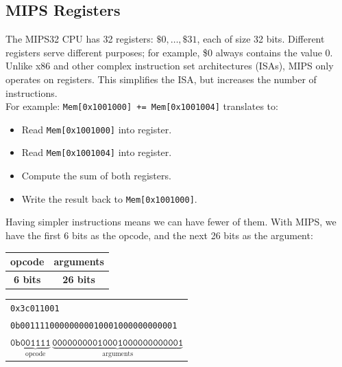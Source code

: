 \documentclass[a4paper, 11pt]{article}
\theoremstyle{definition}
\begin{document}
\newpage

\subsection{MIPS Registers}
The MIPS32 CPU has 32 registers: $\$0, \dots, \$31$, each of size 32 bits. Different registers serve different purposes;
for example, \$0 always contains the value 0. Unlike x86 and other complex instruction set architectures (ISAs), MIPS only 
operates on registers. This simplifies the ISA, but increases the number of instructions. \\
For example: \texttt{Mem[0x1001000] += Mem[0x1001004]} translates to:
\begin{itemize}
    \item Read \texttt{Mem[0x1001000]} into register.
    \item Read \texttt{Mem[0x1001004]} into register.
    \item Compute the sum of both registers.
    \item Write the result back to \texttt{Mem[0x1001000]}.
\end{itemize}
Having simpler instructions means we can have fewer of them. With MIPS, we have the first 6 bits as the opcode, and the
next 26 bits as the argument:
\begin{center}
\begin{tabular}{|p{1.2cm}|p{5.2cm}|}
    \hline
    \centering opcode & \centering\arraybackslash arguments \\
    \hline
    \multicolumn{1}{c}{\textbf{6 bits}} & \multicolumn{1}{c}{\textbf{26 bits}}
\end{tabular}

\vspace{1em}
\begin{tabular}{l}
    \texttt{0x3c011001} \\
    \texttt{0b00111100000000010001000000000001} \\
    $\texttt{0b}\underbrace{\texttt{001111}}_{\text{opcode}}\,\underbrace{\texttt{00000000010001000000000001}}_{\text{arguments}}$ \\[2ex]
\end{tabular}
\end{center}
\end{document}

